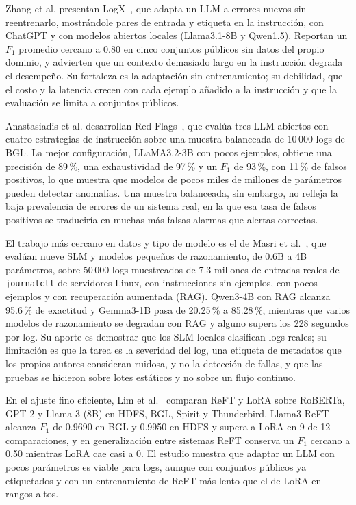 Zhang et al. presentan LogX~\cite{zhang2024_logx}, que adapta un LLM a errores nuevos sin reentrenarlo, mostrándole pares de entrada y etiqueta en la instrucción, con ChatGPT y con modelos abiertos locales (Llama3.1-8B y Qwen1.5). Reportan un $F_1$ promedio cercano a 0.80 en cinco conjuntos públicos sin datos del propio dominio, y advierten que un contexto demasiado largo en la instrucción degrada el desempeño. Su fortaleza es la adaptación sin entrenamiento; su debilidad, que el costo y la latencia crecen con cada ejemplo añadido a la instrucción y que la evaluación se limita a conjuntos públicos.

Anastasiadis et al. desarrollan Red Flags~\cite{anastasiadis2026_redflags}, que evalúa tres LLM abiertos con cuatro estrategias de instrucción sobre una muestra balanceada de 10\,000 logs de BGL. La mejor configuración, LLaMA3.2-3B con pocos ejemplos, obtiene una precisión de 89\,\%, una exhaustividad de 97\,\% y un $F_1$ de 93\,\%, con 11\,\% de falsos positivos, lo que muestra que modelos de pocos miles de millones de parámetros pueden detectar anomalías. Una muestra balanceada, sin embargo, no refleja la baja prevalencia de errores de un sistema real, en la que esa tasa de falsos positivos se traduciría en muchas más falsas alarmas que alertas correctas.

El trabajo más cercano en datos y tipo de modelo es el de Masri et al.~\cite{masri2026_slm_severity}, que evalúan nueve SLM y modelos pequeños de razonamiento, de 0.6B a 4B parámetros, sobre 50\,000 logs muestreados de 7.3 millones de entradas reales de \texttt{journalctl} de servidores Linux, con instrucciones sin ejemplos, con pocos ejemplos y con recuperación aumentada (RAG). Qwen3-4B con RAG alcanza 95.6\,\% de exactitud y Gemma3-1B pasa de 20.25\,\% a 85.28\,\%, mientras que varios modelos de razonamiento se degradan con RAG y alguno supera los 228 segundos por log. Su aporte es demostrar que los SLM locales clasifican logs reales; su limitación es que la tarea es la severidad del log, una etiqueta de metadatos que los propios autores consideran ruidosa, y no la detección de fallas, y que las pruebas se hicieron sobre lotes estáticos y no sobre un flujo continuo.

En el ajuste fino eficiente, Lim et al.~\cite{lim2025_logadreft} comparan ReFT y LoRA sobre RoBERTa, GPT-2 y Llama-3 (8B) en HDFS, BGL, Spirit y Thunderbird. Llama3-ReFT alcanza $F_1$ de 0.9690 en BGL y 0.9950 en HDFS y supera a LoRA en 9 de 12 comparaciones, y en generalización entre sistemas ReFT conserva un $F_1$ cercano a 0.50 mientras LoRA cae casi a 0. El estudio muestra que adaptar un LLM con pocos parámetros es viable para logs, aunque con conjuntos públicos ya etiquetados y con un entrenamiento de ReFT más lento que el de LoRA en rangos altos.

